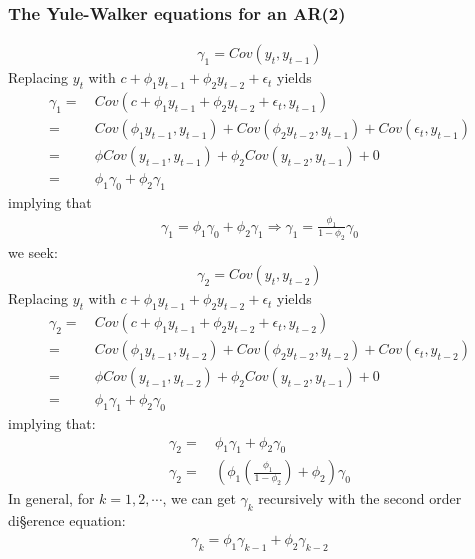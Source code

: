 \documentclass[a4paper,twoside,11pt]{article}
\begin{document}
\subsubsection{The Yule-Walker equations for an AR(2)}
\begin{equation*}
\begin{aligned}
\gamma_1 = Cov(y_t, y_{t-1})
\end{aligned}
\end{equation*}
Replacing $y_t$ with $c+\phi_1 y_{t-1} + \phi_2 y_{t-2} + \epsilon_t$ yields
\begin{equation*}
\begin{aligned}
\gamma_1 =& \ Cov(c+ \phi_1 y_{t-1} + \phi_2 y_{t-2} + \epsilon_t,y_{t-1}) \\
=& \ Cov(\phi_1 y_{t-1},y_{t-1}) + Cov(\phi_2 y_{t-2}, y_{t-1}) + Cov(\epsilon_t, y_{t-1}) \\
=& \ \phi Cov(y_{t-1}, y_{t-1}) + \phi_2 Cov(y_{t-2}, y_{t-1}) + 0 \\
=& \ \phi_1 \gamma_0 + \phi_2 \gamma_1
\end{aligned}
\end{equation*}
implying that
\begin{equation*}
\begin{aligned}
\gamma_1 = \phi_1 \gamma_0 + \phi_2 \gamma_1 \Rightarrow \gamma_1 = \frac{\phi_1}{1-\phi_2}\gamma_0
\end{aligned}
\end{equation*}
we seek:
\begin{equation*}
\begin{aligned}
\gamma_2 = Cov(y_t, y_{t-2})
\end{aligned}
\end{equation*}
Replacing $y_t$ with $c+\phi_1 y_{t-1} + \phi_2 y_{t-2} + \epsilon_t$ yields
\begin{equation*}
\begin{aligned}
\gamma_2 =& \ Cov(c+ \phi_1 y_{t-1} + \phi_2 y_{t-2} + \epsilon_t, y_{t-2}) \\
=& \ Cov(\phi_1 y_{t-1},y_{t-2}) + Cov(\phi_2 y_{t-2}, y_{t-2}) + Cov(\epsilon_t, y_{t-2}) \\
=& \ \phi Cov(y_{t-1}, y_{t-2}) + \phi_2 Cov(y_{t-2}, y_{t-1}) + 0 \\
=& \ \phi_1 \gamma_1 + \phi_2 \gamma_0
\end{aligned}
\end{equation*}
implying that: 
\begin{equation*}
\begin{aligned}
\gamma_2 =& \  \phi_1 \gamma_1 + \phi_2 \gamma_0 \\
\gamma_2 =& \ (\phi_1 (\frac{\phi_1}{1-\phi_2})+\phi_2)\gamma_0
\end{aligned}
\end{equation*}
In general, for $k = 1, 2,\cdots$, we can get $\gamma_k$ recursively with the second order di§erence equation:
\begin{equation*}
\begin{aligned}
\gamma_k = \phi_1 \gamma_{k-1} + \phi_2 \gamma_{k-2}
\end{aligned}
\end{equation*}
\end{document}
